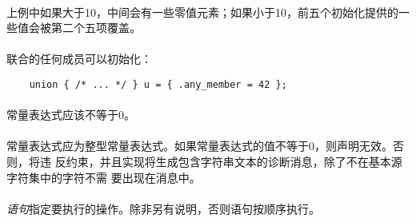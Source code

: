 {\paragraph{}
上例中如果大于10，中间会有一些零值元素；如果小于10，前五个初始化提供的一
些值会被第二个五项覆盖。

\paragraph{}
\ex 联合的任何成员可以初始化：
\begin{lstlisting}
    union { /* ... */ } u = { .any_member = 42 };
\end{lstlisting}


\syntax
\paragraph{}

\constraint
\paragraph{}
常量表达式应该不等于0。

\semantic
\paragraph{}
常量表达式应为整型常量表达式。如果常量表达式的值不等于0，则声明无效。否则，将违
反约束，并且实现将生成包含字符串文本的诊断消息，除了不在基本源字符集中的字符不需
要出现在消息中。


\syntax
\paragraph{}

\semantic
\paragraph{}
\textit{语句}指定要执行的操作。除非另有说明，否则语句按顺序执行。

}
